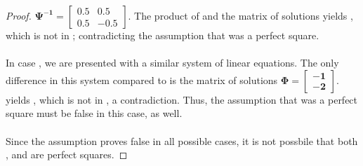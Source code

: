 \documentclass[preview]{standalone}
\begin{document}
\begin{proof}
    $\bm{\Psi^{-1} =} \left[\begin{smallmatrix}
        \bm{0.5} & \bm{0.5} \\
        \bm{0.5} & \bm{-0.5}
    \end{smallmatrix}\right]$. 
    The product of  and the matrix of solutions yields , 
    which is not in ; 
    contradicting the assumption that  was a perfect square.
    \\ \\ 
    In case , 
    we are presented with a similar system of linear equations. 
    The only difference in this system compared to  is the matrix of solutions 
    $\bm{\Phi =} \left[\begin{smallmatrix}
        \bm{-1} \\
        \bm{-2}
    \end{smallmatrix}\right]$. 
     yields , 
    which is not in , 
    a contradiction. 
    Thus, the assumption that  was a perfect square must be false in this case, as well.
    \\ \\
    Since the assumption proves false in all possible cases, 
    it is not possbile that both , and \bm{$\eta$} are perfect squares.
\color{lightgray} \end{proof}
\end{document}
